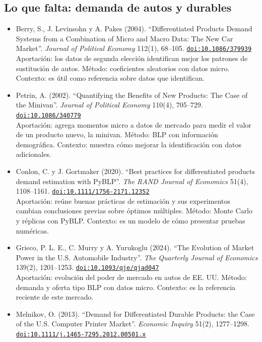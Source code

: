 \documentclass[11pt]{article}
\begin{document}
\subsection*{Lo que falta: demanda de autos y durables}
\begin{itemize}
\item Berry, S., J. Levinsohn y A. Pakes (2004). ``Differentiated Products Demand Systems from a Combination of Micro and Macro Data: The New Car Market''. \textit{Journal of Political Economy} 112(1), 68--105. \href{https://doi.org/10.1086/379939}{\texttt{doi:10.1086/379939}}\\
Aportación: los datos de segunda elección identifican mejor los patrones de sustitución de autos. Método: coeficientes aleatorios con datos micro. Contexto: es útil como referencia sobre datos que identifican.
\item Petrin, A. (2002). ``Quantifying the Benefits of New Products: The Case of the Minivan''. \textit{Journal of Political Economy} 110(4), 705--729. \href{https://doi.org/10.1086/340779}{\texttt{doi:10.1086/340779}}\\
Aportación: agrega momentos micro a datos de mercado para medir el valor de un producto nuevo, la minivan. Método: BLP con información demográfica. Contexto: muestra cómo mejorar la identificación con datos adicionales.
\item Conlon, C. y J. Gortmaker (2020). ``Best practices for differentiated products demand estimation with PyBLP''. \textit{The RAND Journal of Economics} 51(4), 1108--1161. \href{https://doi.org/10.1111/1756-2171.12352}{\texttt{doi:10.1111/1756-2171.12352}}\\
Aportación: reúne buenas prácticas de estimación y sus experimentos cambian conclusiones previas sobre óptimos múltiples. Método: Monte Carlo y réplicas con PyBLP. Contexto: es un modelo de cómo presentar pruebas numéricas.
\item Grieco, P. L. E., C. Murry y A. Yurukoglu (2024). ``The Evolution of Market Power in the U.S. Automobile Industry''. \textit{The Quarterly Journal of Economics} 139(2), 1201--1253. \href{https://doi.org/10.1093/qje/qjad047}{\texttt{doi:10.1093/qje/qjad047}}\\
Aportación: evolución del poder de mercado en autos de EE. UU. Método: demanda y oferta tipo BLP con datos micro. Contexto: es la referencia reciente de este mercado.
\item Melnikov, O. (2013). ``Demand for Differentiated Durable Products: the Case of the U.S. Computer Printer Market''. \textit{Economic Inquiry} 51(2), 1277--1298. \href{https://doi.org/10.1111/j.1465-7295.2012.00501.x}{\texttt{doi:10.1111/j.1465-7295.2012.00501.x}}\\

\end{itemize}
\end{document}
